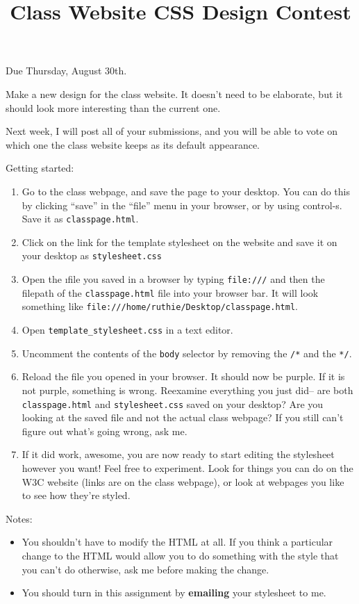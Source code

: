 \documentclass{article}
\title{Class Website CSS Design Contest}
\date{}
\begin{document}
\maketitle
\vspace{-15 mm}

Due Thursday, August 30th.

\vspace{5 mm}
Make a new design for the class website.  It doesn't need to be elaborate, but it should look more interesting than the current one.

\vspace{5 mm}

Next week, I will post all of your submissions, and you will be able to vote on which one the class website keeps as its default appearance.
\vspace{5 mm}

Getting started:
\begin{enumerate}
\item Go to the class webpage, and save the page to your desktop.  You can do this by clicking ``save'' in the ``file'' menu in your browser, or by using control-s.  Save it as \texttt{classpage.html}.
\item Click on the link for the template stylesheet on the website and save it on your desktop as \texttt{stylesheet.css}
\item Open the \i{file you saved} in a browser by typing \texttt{file:///} and then the filepath of the \texttt{classpage.html} file into your browser bar.  It will look something like \texttt{file:///home/ruthie/Desktop/classpage.html}.
\item Open \texttt{template\_stylesheet.css} in a text editor.
\item Uncomment the contents of the \texttt{body} selector by removing the \texttt{/*} and the \texttt{*/}.
\item Reload the file you opened in your browser.  It should now be purple.  If it is not purple, something is wrong.  Reexamine everything you just did-- are both \texttt{classpage.html} and \texttt{stylesheet.css} saved on your desktop?  Are you looking at the saved file and not the actual class webpage?  If you still can't figure out what's going wrong, ask me.
\item If it did work, awesome, you are now ready to start editing the stylesheet however you want!  Feel free to experiment.  Look for things you can do on the W3C website (links are on the class webpage), or look at webpages you like to see how they're styled.

\end{enumerate}

Notes:
\begin{itemize}
\item You shouldn't have to modify the HTML at all.  If you think a particular change to the HTML would allow you to do something with the style that you can't do otherwise, ask me before making the change. 
\item You should turn in this assignment by {\bf emailing} your stylesheet to me.
\end{itemize}
\end{document}
